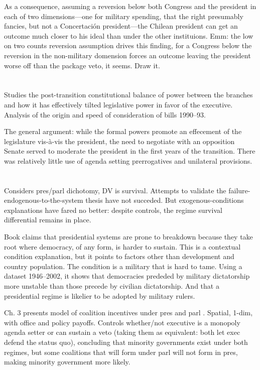 \documentclass[letter,12pt]{article}
\begin{document}
As a consequence, assuming a reversion below both Congress and the president in each of two dimensions---one for military spending, that the right presumably fancies, but not a Concertación president---the Chilean president can get an outcome much closer to his ideal than under the other instituions. Emm: the low on two counts reversion assumption drives this finding, for a Congress below the reversion in the non-military domension forces an outcome leaving the president worse off than the package veto, it seems. Draw it. 

\section{\citet{siavelis.2002}}

Studies the post-transition constitutional balance of power between the branches and how it has effectively tilted legislative power in favor of the executive. Analysis of the origin and speed of consideration of bills 1990--93. 

The general argument: while the formal powers promote an effecement of the legislature vis-\`a-vis the president, the need to negotiate with an opposition Senate served to moderate the president in the first years of the transition. There was relatively little use of agenda setting prerrogatives and unilateral provisions. 



\section{\citet{cheibub.2007}} 

Considers pres/parl dichotomy, DV is survival. Attempts to validate the failure-endogenous-to-the-system thesis \citep[ie.,][]{linz.1990} have not succeded. But exogenous-conditions explanations \citep[eg.,][]{mainwaring.shugart.1997} have fared no better: despite controls, the regime survival differential remains in place. 

Book claims that presidential systems are prone to breakdown because they take root where democracy, of any form, is harder to sustain. This is a contextual condition explanation, but it points to factors other than development and country population. The condition is a military that is hard to tame. Using a dataset 1946--2002, it shows that democracies prededed by military dictatorship more unstable than those precede by civilian dictatorship. And that a presidential regime is likelier to be adopted by military rulers. 

Ch. 3 presents model of coalition incentives under pres and parl \citep[cf.][]{austen.banks.1988}. Spatial, 1-dim, with office and policy payoffs. Controls whether/not executive is a monopoly agenda setter or can sustain a veto (taking them as equivalent: both let exec defend the status quo), concluding that minority governments exist under both regimes, but some coalitions that will form under parl will not form in pres, making minority government more likely.  



\end{document}
